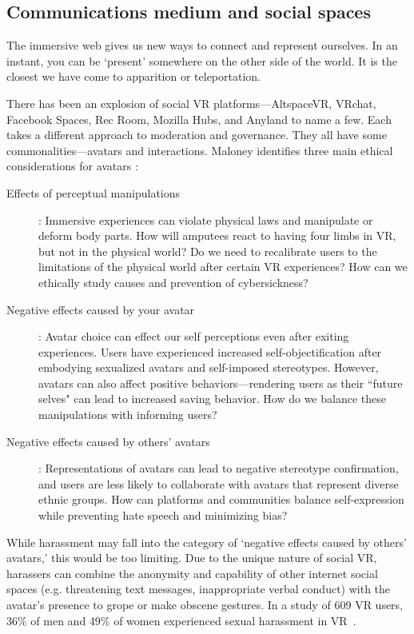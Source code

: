 \subsection{Communications medium and social spaces} \label{subsec:communications}
The immersive web gives us new ways to connect and represent ourselves. In an instant, you can be `present' somewhere on the other side of the world. It is the closest we have come to apparition or teleportation.

There has been an explosion of social VR platforms---AltspaceVR, VRchat, Facebook Spaces, Rec Room, Mozilla Hubs, and Anyland to name a few. Each takes a different approach to moderation and governance. They all have some commonalities---avatars and interactions. Maloney identifies three main ethical considerations for avatars \cite{maloney}:
\begin{description}
	\item[ Effects of perceptual manipulations]: Immersive experiences can violate physical laws and manipulate or deform body parts. How will amputees react to having four limbs in VR, but not in the physical world? Do we need to recalibrate users to the limitations of the physical world after certain VR experiences? How can we ethically study causes and prevention of cybersickness?
	\item [Negative effects caused by your avatar]: Avatar choice can effect our self perceptions even after exiting experiences. Users have experienced increased self-objectification after embodying sexualized avatars and self-imposed stereotypes. However, avatars can also affect positive behaviors---rendering users as their ``future selves" can lead to increased saving behavior. How do we balance these manipulations with informing users?
	\item [Negative effects caused by others' avatars]: Representations of avatars can lead to negative stereotype confirmation, and users are less likely to collaborate with avatars that represent diverse ethnic groups. How can platforms and communities balance self-expression while preventing hate speech and minimizing bias?
\end{description}

While harassment may fall into the category of `negative effects caused by others' avatars,' this would be too limiting. Due to the unique nature of social VR, harassers can combine the anonymity and capability of other internet social spaces (e.g. threatening text messages, inappropriate verbal conduct) with the avatar's presence to grope or make obscene gestures. In a study of 609 VR users, 36\% of men and 49\% of women experienced sexual harassment in VR~\cite{outlaw2018}.

